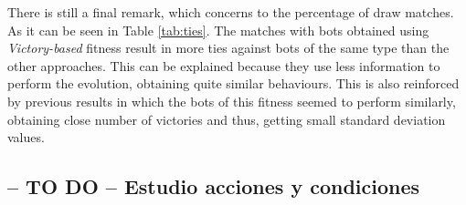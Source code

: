 \documentclass[preprint]{elsarticle}
\begin{document}
There is still a final remark, which concerns to the percentage of draw matches.
As it can be seen in Table \ref{tab:ties}. The matches with bots obtained using \textit{Victory-based}
fitness  result in more ties against bots of the same type than the
other approaches. %
This can be explained because they use less
information to perform the evolution, obtaining quite similar
behaviours. %
This is also reinforced by previous results in which the
bots of this fitness seemed to perform similarly, obtaining close
number of victories and thus, getting small standard deviation
values. 


\begin{table}
\end{table}


\subsection{-- TO DO -- Estudio acciones y condiciones}
\end{document}
